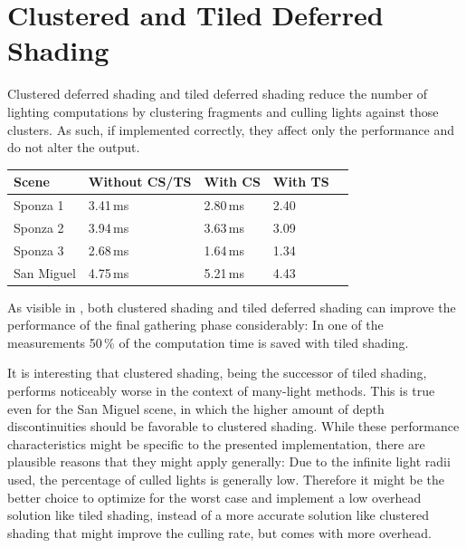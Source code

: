 \vspace{-10pt}

\section{Clustered and Tiled Deferred Shading}
\label{sec:results:clusteredShading}

Clustered deferred shading and tiled deferred shading reduce the number of lighting computations by clustering fragments and culling lights against those clusters. As such, if implemented correctly, they affect only the performance and do not alter the output.

\begin{table}[htb]
    \centering
    \begin{tabulary}{0.98\textwidth}{| L | L | L | L | L |}
        \hline
        Scene & Without CS/TS & With CS & With TS \\ \hline
        Sponza 1 & 3.41\,ms & 2.80\,ms & 2.40\\
        Sponza 2 & 3.94\,ms & 3.63\,ms & 3.09\\
        Sponza 3 & 2.68\,ms & 1.64\,ms & 1.34\\
        San Miguel & 4.75\,ms & 5.21\,ms & 4.43\\
        \hline
    \end{tabulary}
    \label{tab:results:timings_clustered_shading}
    \vspace{-10pt}
\end{table}


As visible in , both clustered shading and tiled deferred shading can improve the performance of the final gathering phase considerably: In one of the measurements 50\,\% of the computation time is saved with tiled shading.


It is interesting that clustered shading, being the successor of tiled shading, performs noticeably worse in the context of many-light methods. This is true even for the San Miguel scene, in which the higher amount of depth discontinuities should be favorable to clustered shading. While these performance characteristics might be specific to the presented implementation, there are plausible reasons that they might apply generally: Due to the infinite light radii used, the percentage of culled lights is generally low. Therefore it might be the better choice to optimize for the worst case and implement a low overhead solution like tiled shading, instead of a more accurate solution like clustered shading that might improve the culling rate, but comes with more overhead.

